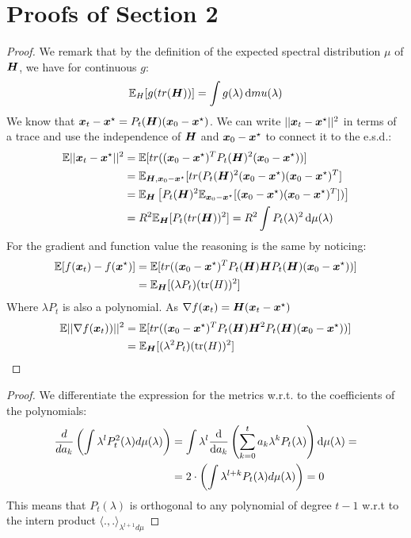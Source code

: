 \documentclass{article}
\begin{document}
\section{Proofs of Section 2}
\metrics*
\begin{proof}
\newcommand\xinit{\xx_0-\xx^\star}
We remark that by the definition of the expected spectral distribution $\mu$ of ${\boldsymbol H}$, we have for continuous $g$:
\begin{equation}
    {\mathbb{E}}_H[g(tr({\boldsymbol H}))]=\int g(\lambda)\mathop{}\!\mathrm{d} mu(\lambda)
\end{equation}
We know that $\xx_t-\xx^\star=P_t(\HH)(\xinit)$. We can write $||{\boldsymbol x}_t-{\boldsymbol x}^\star||^2$ in terms of a trace and use the independence of ${\boldsymbol H}$ and $\xinit$ to connect it to the e.s.d.:
\begin{align}
    \mathbb{E}||\xx_t-\xx^\star||^2&=\EE[ tr((\xinit)^TP_t(\HH)^2(\xinit))] \\
    &=\EE_{\HH,\xinit} [tr(P_t(\HH)^2(\xinit)(\xinit)^T]\\
    &=\EE_\HH\left[P_t(\HH)^2\EE_{\xinit}[(\xinit)(\xinit)^T])\right]  \\
    &=R^2\EE_\HH[P_t(tr(\HH))^2]=R^2 \int P_t(\lambda)^2\dif\mu(\lambda)
\end{align}
For the gradient and function value the reasoning is the same by noticing:
\begin{align}
    \EE[f(\xx_t)-f(\xx^\star)]&=\EE[ tr((\xinit)^TP_t(\HH)\HH P_t(\HH)(\xinit))]\\
    &=\EE_\HH[(\lambda P_t)(\tr(H))^2] 
\end{align}
Where $\lambda P_t$ is also a  polynomial. As $\nabla f({\boldsymbol x}_t)={\boldsymbol H}({\boldsymbol x}_t-{\boldsymbol x}^\star)$
\begin{align}
    \EE||\nabla f(\xx_t))||^2&=\EE[ tr((\xinit)^TP_t(\HH)\HH^2 P_t(\HH)(\xinit))]\\
    &=\EE_\HH[(\lambda^2 P_t)(\tr(H))^2]
\end{align}


\end{proof}

\optimality*
\begin{proof}
We differentiate the expression for the metrics w.r.t. to the coefficients of the polynomials:
\begin{align*}
    \frac{d}{da_k}\left(\int \lambda^lP_t^2(\lambda)d\mu(\lambda)\right)&=\int\lambda^l\frac{\mathop{}\!\mathrm{d}}{\mathop{}\!\mathrm{d} a_k}\left(\sum_{k=0}^t a_k\lambda^kP_t(\lambda) \right) \mathop{}\!\mathrm{d} \mu(\lambda)=
    \\&=2\cdot\left(\int \lambda^{l+k}P_t(\lambda)d\mu(\lambda)\right)=0
\end{align*}
This means that $P_t(\lambda)$ is orthogonal to any polynomial of degree $t-1$  w.r.t to the intern product $\langle.,.\rangle_{\lambda^{l+1}d\mu}$

\end{proof}
\end{document}
